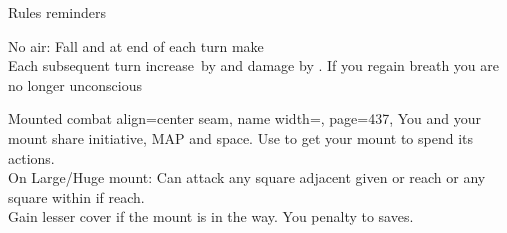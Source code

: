 \begin{PageFront}
\begin{Tables}{\frontTableHeight}
\begin{Table}{Rules reminders}
\begin{entry}{}
                No air: Fall  and at end of each turn make \Fortitude[][val=20]  \hfill  {}\\
                Each subsequent turn increase \DC\,by  and damage by . \hfill If you regain breath
                you are no longer unconscious%
            \end{entry}
            \begin{entry}{Mounted combat}{%
                align=center seam,
                name width=\conditionLength,
                page=437,
            }
                You and your mount share initiative, MAP and space. Use  to get your mount to
                spend its actions.\\
                On Large/Huge mount: Can attack any square adjacent given  or  \Feet reach or any
                square within  \Feet if  \Feet reach.\\Gain lesser cover if the mount is
                in the way. You  \Cirm penalty to \ReflexT saves.\hfill {}
            \end{entry}

        \end{Table}
    \end{Tables}%
\end{PageFront}